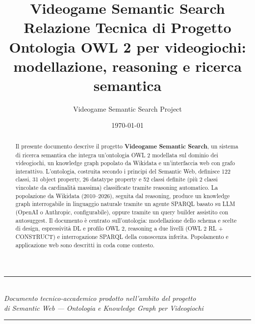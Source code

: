 \documentclass[11pt,a4paper]{article}
\title{{\Huge Videogame Semantic Search}\\[6pt]
       {\large Relazione Tecnica di Progetto}\\[6pt]
       {\normalsize Ontologia OWL 2 per videogiochi: modellazione, reasoning e ricerca semantica}}
\author{{\large Videogame Semantic Search Project}}
\date{\today\\[4pt]}
\begin{document}
\maketitle
\thispagestyle{empty}

\begin{center}
  \rule{0.8\textwidth}{0.5pt}\\[8pt]
  \textit{Documento tecnico-accademico prodotto nell'ambito del progetto \\
  di Semantic Web --- Ontologia e Knowledge Graph per Videogiochi}\\[8pt]
  \rule{0.8\textwidth}{0.5pt}
\end{center}

\vspace{1cm}

\begin{abstract}
\noindent
Il presente documento descrive il progetto \textbf{Videogame Semantic Search}, un sistema
di ricerca semantica che integra un'ontologia OWL 2 modellata sul dominio dei videogiochi,
un knowledge graph popolato da Wikidata e un'interfaccia web con grafo interattivo.
L'ontologia, costruita secondo i principi del Semantic Web, definisce 122 classi,
31 object property, 26 datatype property e 52 classi definite (pi\`u 2 classi vincolate
da cardinalit\`a massima) classificate tramite reasoning automatico.
La popolazione da Wikidata (2010--2026), seguita dal reasoning, produce un knowledge graph
interrogabile in linguaggio naturale tramite un agente SPARQL basato su LLM (OpenAI o Anthropic,
configurabile), oppure tramite un query builder assistito con autosuggest.
Il documento \`e centrato sull'ontologia: modellazione dello schema e scelte di design,
espressivit\`a DL e profilo OWL 2, reasoning a due livelli (OWL 2 RL + CONSTRUCT) e
interrogazione SPARQL della conoscenza inferita. Popolamento e applicazione web sono
descritti in coda come contesto.
\end{abstract}

\newpage

\tableofcontents
\newpage
















\appendix






\end{document}
